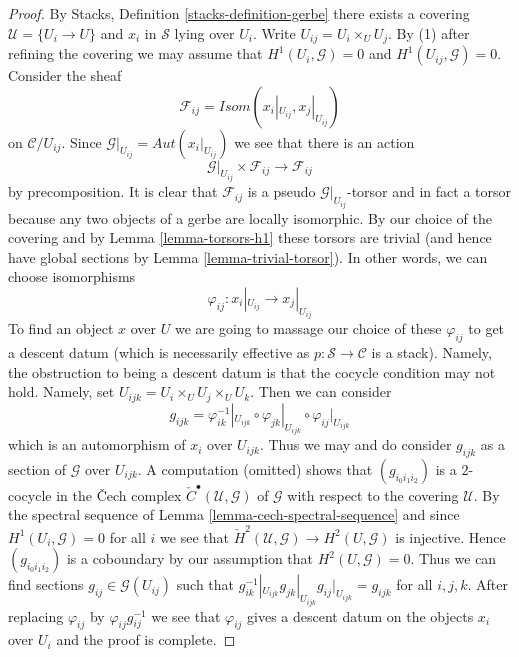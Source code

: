 \begin{proof}
By Stacks, Definition \ref{stacks-definition-gerbe}
there exists a covering $\mathcal{U} = \{U_i \to U\}$
and $x_i$ in $\mathcal{S}$ lying over $U_i$.
Write $U_{ij} = U_i \times_U U_j$. By (1) after refining the covering
we may assume that $H^1(U_i, \mathcal{G}) = 0$ and
$H^1(U_{ij}, \mathcal{G}) = 0$.
Consider the sheaf
$$
\mathcal{F}_{ij} =
\mathit{Isom}(x_i|_{U_{ij}}, x_j|_{U_{ij}})
$$
on $\mathcal{C}/U_{ij}$. Since
$\mathcal{G}|_{U_{ij}} = \mathit{Aut}(x_i|_{U_{ij}})$ we see that there
is an action
$$
\mathcal{G}|_{U_{ij}} \times \mathcal{F}_{ij} \to \mathcal{F}_{ij}
$$
by precomposition. It is clear that $\mathcal{F}_{ij}$ is a
pseudo $\mathcal{G}|_{U_{ij}}$-torsor and in fact a torsor because
any two objects of a gerbe are locally isomorphic.
By our choice of the covering and by
Lemma \ref{lemma-torsors-h1}
these torsors are trivial (and hence have global sections by
Lemma \ref{lemma-trivial-torsor}).
In other words, we can choose isomorphisms
$$
\varphi_{ij} : x_i|_{U_{ij}} \longrightarrow x_j|_{U_{ij}}
$$
To find an object $x$ over $U$ we are going to massage our choice
of these $\varphi_{ij}$ to get a descent datum (which is necessarily
effective as $p : \mathcal{S} \to \mathcal{C}$ is a stack).
Namely, the obstruction to being a descent datum is that the cocycle
condition may not hold. Namely, set $U_{ijk} = U_i \times_U U_j \times_U U_k$.
Then we can consider
$$
g_{ijk} = \varphi_{ik}^{-1}|_{U_{ijk}} \circ \varphi_{jk}|_{U_{ijk}} \circ
\varphi_{ij}|_{U_{ijk}}
$$
which is an automorphism of $x_i$ over $U_{ijk}$. Thus we may and do
consider $g_{ijk}$ as a section of $\mathcal{G}$ over $U_{ijk}$.
A computation (omitted) shows that $(g_{i_0i_1i_2})$ is a $2$-cocycle
in the {\v C}ech complex ${\check C}^\bullet(\mathcal{U}, \mathcal{G})$
of $\mathcal{G}$ with respect to the covering $\mathcal{U}$.
By the spectral sequence of
Lemma \ref{lemma-cech-spectral-sequence}
and since $H^1(U_i, \mathcal{G}) = 0$ for all $i$
we see that ${\check H}^2(\mathcal{U}, \mathcal{G}) \to H^2(U, \mathcal{G})$
is injective. Hence $(g_{i_0i_1i_2})$ is a coboundary
by our assumption that $H^2(U, \mathcal{G}) = 0$.
Thus we can find sections $g_{ij} \in \mathcal{G}(U_{ij})$ such that
$g_{ik}^{-1}|_{U_{ijk}} g_{jk}|_{U_{ijk}}  g_{ij}|_{U_{ijk}} = g_{ijk}$
for all $i, j, k$.
After replacing $\varphi_{ij}$ by $\varphi_{ij}g_{ij}^{-1}$
we see that $\varphi_{ij}$ gives a descent datum on the objects
$x_i$ over $U_i$ and the proof is complete.
\end{proof}












